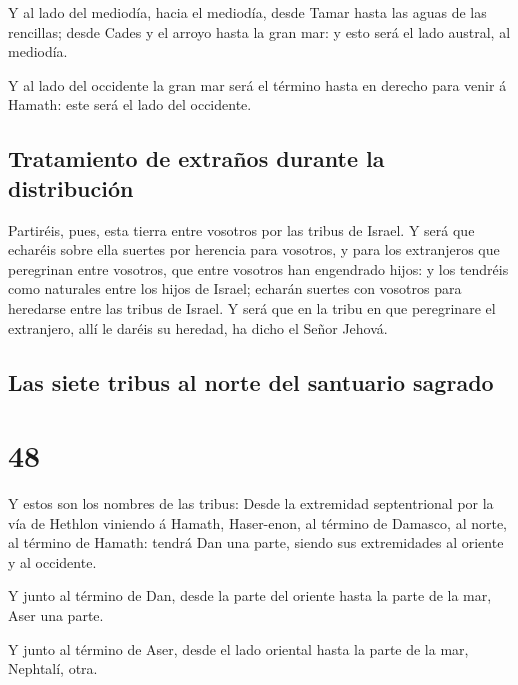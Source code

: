  Y al lado del mediodía, hacia el mediodía, desde Tamar
hasta las aguas de las rencillas; desde Cades y el arroyo hasta la gran
mar: y esto será el lado austral, al mediodía.

 Y al lado del occidente la gran mar será el término
hasta en derecho para venir á Hamath: este será el lado del occidente.

\hypertarget{tratamiento-de-extrauxf1os-durante-la-distribuciuxf3n}{%
\subsection{Tratamiento de extraños durante la
distribución}\label{tratamiento-de-extrauxf1os-durante-la-distribuciuxf3n}}

 Partiréis, pues, esta tierra entre vosotros por las
tribus de Israel.  Y será que echaréis sobre ella suertes
por herencia para vosotros, y para los extranjeros que peregrinan entre
vosotros, que entre vosotros han engendrado hijos: y los tendréis como
naturales entre los hijos de Israel; echarán suertes con vosotros para
heredarse entre las tribus de Israel.  Y será que en la
tribu en que peregrinare el extranjero, allí le daréis su heredad, ha
dicho el Señor Jehová.

\hypertarget{las-siete-tribus-al-norte-del-santuario-sagrado}{%
\subsection{Las siete tribus al norte del santuario
sagrado}\label{las-siete-tribus-al-norte-del-santuario-sagrado}}

\hypertarget{section-47}{%
\section{48}\label{section-47}}

 Y estos son los nombres de las tribus: Desde la
extremidad septentrional por la vía de Hethlon viniendo á Hamath,
Haser-enon, al término de Damasco, al norte, al término de Hamath:
tendrá Dan una parte, siendo sus extremidades al oriente y al occidente.

 Y junto al término de Dan, desde la parte del oriente
hasta la parte de la mar, Aser una parte.

 Y junto al término de Aser, desde el lado oriental hasta
la parte de la mar, Nephtalí, otra.

